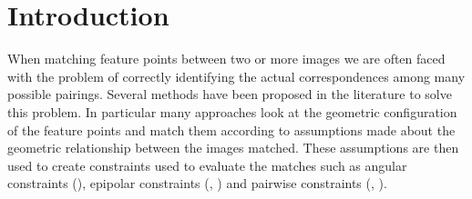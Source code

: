 \documentclass[12pt,journal,compsoc]{IEEEtran}
\begin{document}
\section{Introduction}
%
When matching feature points between two or more images we are often 
faced with the problem of correctly identifying the actual 
correspondences among many possible pairings. Several methods have been 
proposed in the literature to solve this problem. In particular many 
approaches look at the geometric configuration of the feature points and 
match them according to assumptions made about the geometric 
relationship between the images matched. These assumptions are then used 
to create constraints used to evaluate the matches such as angular 
constraints (\cite{kim2008efficient}), epipolar constraints 
(\cite{torr2000mlesac}, \cite{chum2005matching}) and pairwise 
constraints (\cite{choi2009robust}, \cite{leordeanu2005spectral}).
%
\end{document}
